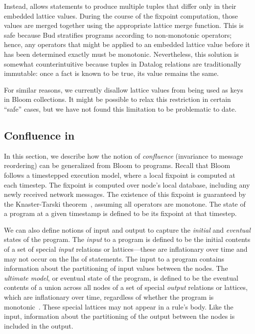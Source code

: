 Instead, \lang allows statements to produce multiple tuples that differ only in
their embedded lattice values. During the course of the fixpoint computation,
those values are merged together using the appropriate lattice merge
function. This is safe because Bud stratifies programs according to
non-monotonic operators; hence, any operators that might be applied to an
embedded lattice value before it has been determined exactly must be
monotonic. Nevertheless, this solution is somewhat counterintuitive because
tuples in Datalog relations are traditionally immutable: once a fact is known to
be true, its value remains the same.


For similar reasons, we currently disallow lattice values from being used as
keys in Bloom collections. It might be possible to relax this restriction in
certain ``safe'' cases, but we have not found this limitation to be problematic
to date.

\subsection{Confluence in \lang}
In this section, we describe how the notion of \emph{confluence} (invariance to
message reordering) can be generalized from Bloom to \lang programs.  Recall
that Bloom follows a timestepped execution model, where a local fixpoint is
computed at each timestep.  The fixpoint is computed over node's local database,
including any newly received network messages. The existence of this fixpoint is
guaranteed by the Knaster-Tarski theorem~\cite{Tarski1955}, assuming all \lang
operators are monotone.  The state of a program at a given timestamp is defined
to be its fixpoint at that timestep.

We can also define notions of input and output to capture the {\em initial} and
{\em eventual} states of the program.  The {\em input} to a \lang program is
defined to be the initial contents of a set of special {\em input} relations or
lattices---these are inflationary over time and may not occur on the lhs of
statements.  The input to a program contains information about the partitioning
of input values between the nodes.  The {\em ultimate model}, or eventual state
of the program, is defined to be the eventual contents of a union across all
nodes of a set of special {\em output} relations or lattices, which are
inflationary over time, regardless of whether the \lang program is
monotonic~\cite{dedalus-pods12-tr}.  These special lattices may not appear in a
rule's body.  Like the input, information about the partitioning of the output
between the nodes is included in the output.

